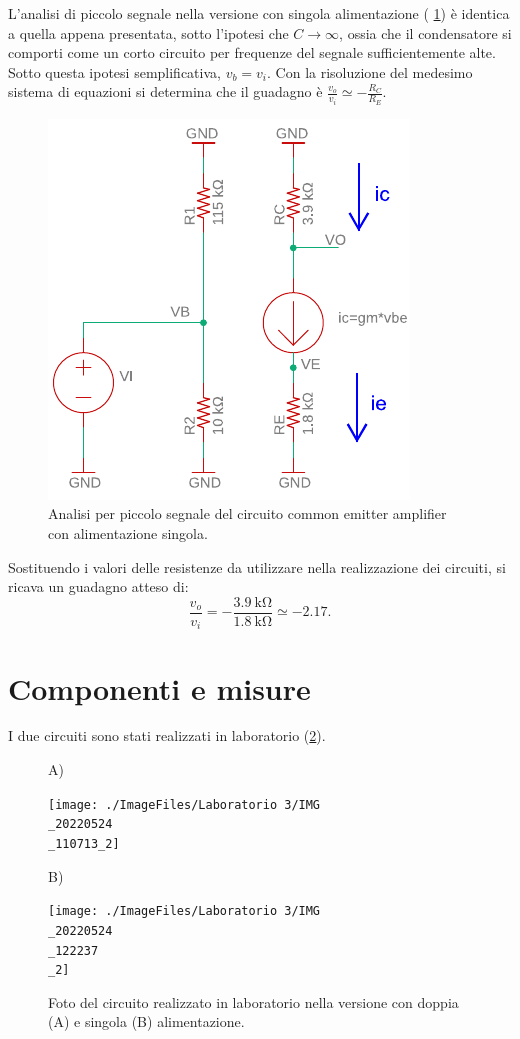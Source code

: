 \noindent
L'analisi di piccolo segnale nella versione con singola alimentazione (\Fig
\ref{fig:commonemitter_se_AC}) è identica a quella appena presentata, sotto l'ipotesi che $C\to\infty$, ossia che il condensatore si comporti come un corto circuito per frequenze del segnale sufficientemente alte. Sotto questa ipotesi semplificativa, $v_b=v_i$. Con la risoluzione del medesimo sistema di equazioni si determina che il guadagno è $\frac{v_o}{v_i}\simeq-\frac{R_C}{R_E}.$
\begin{figure}[h!]
	\centering
	\includegraphics[width=0.4\linewidth]{./OtherFiles/Laboratorio 3/common emitter_se-piccolo segnale-printout}
	\caption{Analisi per piccolo segnale del circuito common emitter amplifier con alimentazione singola.}
	\label{fig:commonemitter_se_AC}
\end{figure}

\noindent
Sostituendo i valori delle resistenze da utilizzare nella realizzazione dei circuiti, si ricava un guadagno atteso di:
\begin{equation}
	\frac{v_o}{v_i}=-\frac{\SI{3.9}{\kilo\ohm}}{\SI{1.8}{\kilo\ohm}}\simeq -2.17.
\end{equation}

\section{Componenti e misure}
I due circuiti sono stati realizzati in laboratorio (\Fig\ref{fig:commonemitter_circuito}).
\begin{figure}[h!]
	\centering
	A)
	
	\texttt{[image: ./ImageFiles/Laboratorio 3/IMG\\\_20220524\\\_110713\_2]}
	
	B)
	
	\texttt{[image: ./ImageFiles/Laboratorio 3/IMG\\\_20220524\\\_122237\\\_2]}
	\caption{Foto del circuito realizzato in laboratorio nella versione con doppia (A) e singola (B) alimentazione.}
	\label{fig:commonemitter_circuito}
\end{figure}

